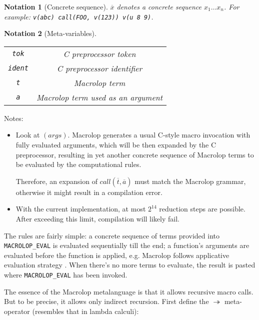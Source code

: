 \documentclass[12pt]{article}
\theoremstyle{break}
\newtheorem{notation}{Notation}
\begin{document}
\begin{notation}[Concrete sequence]
    \label{ConcreteSequenceNotation}
    $\overline{x}$ denotes a concrete sequence $x_1 \ldots x_n$. For example:
    \texttt{v(abc) call(FOO, v(123)) v(u 8 9)}.
\end{notation}

\begin{notation}[Meta-variables]
    \ \\
    \begin{tabular}{|c|c|}
        \hline
        \texttt{tok} & C preprocessor token \\
        \texttt{ident} & C preprocessor identifier \\
        \texttt{t} & Macrolop term \\
        \texttt{a} & Macrolop term used as an argument \\
        \hline
    \end{tabular}
\end{notation}

Notes:

\begin{itemize}
    \item Look at $(args)$. Macrolop generates a usual C-style macro invocation with
    fully evaluated arguments, which will be then expanded by the C preprocessor, resulting
    in yet another concrete sequence of Macrolop terms to be evaluated by the computational
    rules. \par Therefore, an expansion of $call(\overline{t}, \overline{a})$
    must match the Macrolop grammar, otherwise it might result in a compilation error.
    \item With the current implementation, at most $2^{14}$ reduction steps are
    possible. After exceeding this limit, compilation will likely fail.
\end{itemize}

The rules are fairly simple: a concrete sequence of terms provided into \\
\texttt{MACROLOP\_EVAL} is evaluated sequentially till the end; a function's arguments
are evaluated before the function is applied, e.g. Macrolop follows applicative
evaluation strategy \cite{ApplicativeEvaluationStrategy}. When there's no more terms
to evaluate, the result is pasted where \texttt{MACROLOP\_EVAL} has been invoked.

The essence of the Macrolop metalanguage is that it allows recursive macro calls. But
to be precise, it allows only indirect recursion. First define the $\twoheadrightarrow$
meta-operator (resembles that in lambda calculi):
\end{document}
